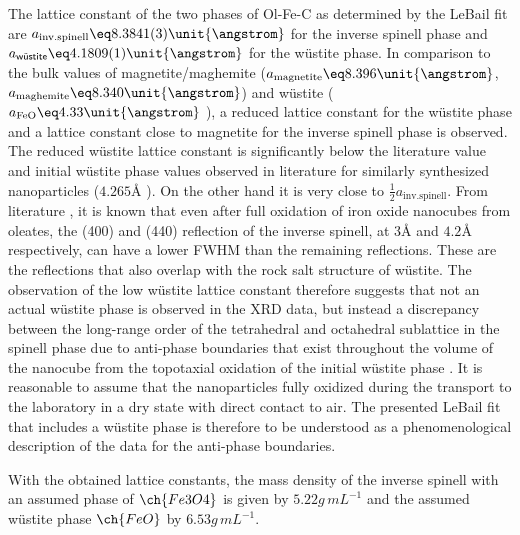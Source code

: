 \documentclass[\main/dresen_thesis.tex]{subfiles}
\begin{document}
  The lattice constant of the two phases of Ol-Fe-C as determined by the LeBail fit are $a_\mathrm{inv. spinell} \eq 8.3841(3) \unit{\angstrom}$ for the inverse spinell phase and $a_\textsf{w\"ustite} \eq 4.1809(1) \unit{\angstrom}$ for the w\"ustite phase.
  In comparison to the bulk values of magnetite/maghemite ($a_\mathrm{magnetite} \eq 8.396 \unit{\angstrom}$, $a_\mathrm{maghemite} \eq 8.340 \unit{\angstrom}$) \cite{Cornell_2003_Their} and w\"ustite ($a_\mathrm{FeO} \eq 4.33 \unit{\angstrom}$ \cite{Hentschel_1970_Stoich}), a reduced lattice constant for the w\"ustite phase and a lattice constant close to magnetite for the inverse spinell phase is observed.
  The reduced w\"ustite lattice constant is significantly below the literature value and initial w\"ustite phase values observed in literature for similarly synthesized nanoparticles ($4.265 \unit{\angstrom}$ \cite{Wetterskog_2013_Anoma}).
  On the other hand it is very close to $\tfrac{1}{2} a_\mathrm{inv. spinell}$.
  From literature \cite{Wetterskog_2013_Anoma}, it is known that even after full oxidation of iron oxide nanocubes from oleates, the (400) and (440) reflection of the inverse spinell, at $3 \unit{\angstrom}$ and $4.2 \unit{\angstrom}$ respectively, can have a lower FWHM than the remaining reflections.
  These are the reflections that also overlap with the rock salt structure of w\"ustite.
  The observation of the low w\"ustite lattice constant therefore suggests that not an actual w\"ustite phase is observed in the XRD data, but instead a discrepancy between the long-range order of the tetrahedral and octahedral sublattice in the spinell phase due to anti-phase boundaries that exist throughout the volume of the nanocube from the topotaxial oxidation of the initial w\"ustite phase \cite{Wetterskog_2013_Anoma}.
  It is reasonable to assume that the nanoparticles fully oxidized during the transport to the laboratory in a dry state with direct contact to air.
  The presented LeBail fit that includes a w\"ustite phase is therefore to be understood as a phenomenological description of the data for the anti-phase boundaries.

  With the obtained lattice constants, the mass density of the inverse spinell with an assumed phase of $\ch{Fe3O4}$ is given by $5.22 \unit{g \, mL^{-1}}$ and the assumed w\"ustite phase $\ch{FeO}$ by $6.53 \unit{g \, mL^{-1}}$.
  \\
\end{document}
